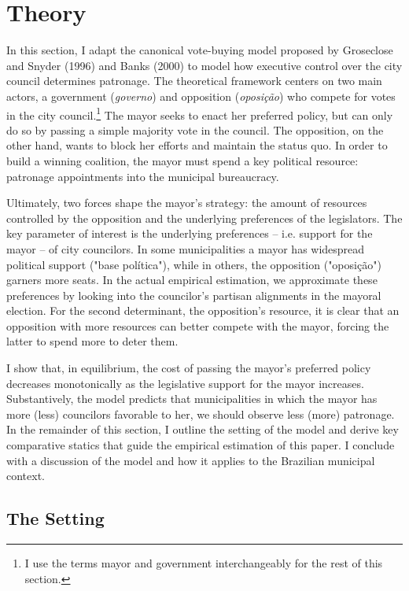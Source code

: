 \documentclass[12pt,a4paper]{article}
\begin{document}
\section*{Theory}

In this section, I adapt the canonical vote-buying model proposed by Groseclose and Snyder (1996) and Banks (2000) to model how executive control over the city council determines patronage. The theoretical framework centers on two main actors, a government (\emph{governo}) and opposition (\emph{oposição}) who compete for votes in the city council.\footnote{I use the terms mayor and government interchangeably for the rest of this section.} The mayor seeks to enact her preferred policy, but can only do so by passing a simple majority vote in the council. The opposition, on the other hand, wants to block her efforts and maintain the status quo. In order to build a winning coalition, the mayor must spend a key political resource: patronage appointments into the municipal bureaucracy.

Ultimately, two forces shape the mayor's strategy: the amount of resources controlled by the opposition and the underlying preferences of the legislators. The key parameter of interest is the underlying preferences -- i.e. support for the mayor -- of city councilors. In some municipalities a mayor has widespread political support ("base política"), while in others, the opposition ("oposição") garners more seats. In the actual empirical estimation, we approximate these preferences by looking into the councilor's partisan alignments in the mayoral election. For the second determinant, the opposition's resource, it is clear that an opposition with more resources can better compete with the mayor, forcing the latter to spend more to deter them.

I show that, in equilibrium, the cost of passing the mayor's preferred policy decreases monotonically as the legislative support for the mayor increases. Substantively, the model predicts that municipalities in which the mayor has more (less) councilors favorable to her, we should observe less (more) patronage. In the remainder of this section, I outline the setting of the model and derive key comparative statics that guide the empirical estimation of this paper. I conclude with a discussion of the model and how it applies to the Brazilian municipal context.

\subsection*{The Setting}
\end{document}
